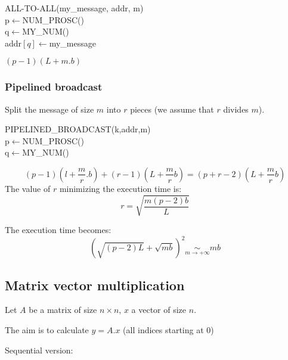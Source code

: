 \begin{algorithm}[H]
ALL-TO-ALL(my\_message, addr, m)\\
p$\leftarrow$NUM\_PROSC()\\
q$\leftarrow$MY\_NUM()\\
addr$[q]\leftarrow$my\_message\\
\end{algorithm}

$(p-1)(L+m.b)$

\subsubsection{Pipelined broadcast}
Split the message of size $m$ into $r$ pieces (we assume that $r$ divides $m$).

\begin{algorithm}[H]
PIPELINED\_BROADCAST(k,addr,m)\\
p$\leftarrow$NUM\_PROSC()\\
q$\leftarrow$MY\_NUM()\\
\end{algorithm}


\[(p-1)(l+\frac{m}{r}.b)+(r-1)(L+\frac{m}{r}b)=(p+r-2)(L+\frac{m}{r}b)\]
The value of $r$ minimizing the execution time is: 
\[r=\sqrt{\frac{m(p-2)b}{L}}\]

The execution time becomes:
\[(\sqrt{(p-2)L}+\sqrt{mb})^2 \underset{m\to +\infty}{\sim} mb \]


\subsection{Matrix vector multiplication}

Let $A$ be a matrix of size $n\times n$, $x$ a vector of size $n$.

The aim is to calculate $y=A.x$ (all indices starting at 0)

Sequential version:

\begin{algorithm}
\end{algorithm}

